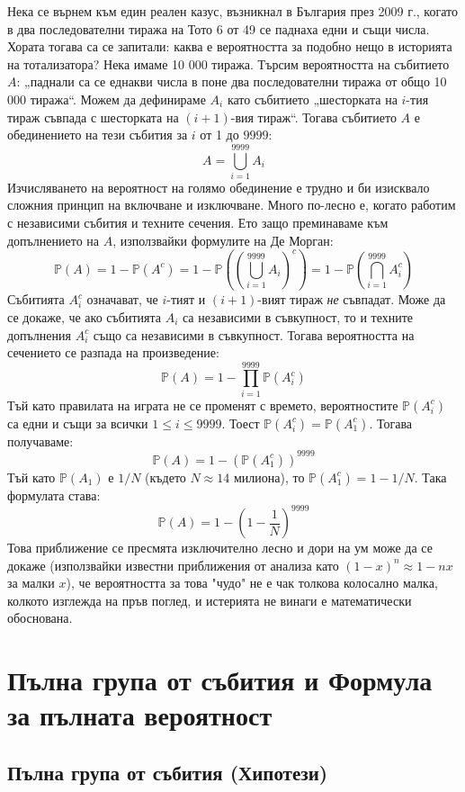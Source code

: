 \documentclass{article}
\begin{document}
Нека се върнем към един реален казус, възникнал в България през 2009 г., когато в два последователни тиража на Тото 6 от 49 се паднаха едни и същи числа. Хората тогава са се запитали: каква е вероятността за подобно нещо в историята на тотализатора?
Нека имаме 10 000 тиража. Търсим вероятността на събитието $A$: „паднали са се еднакви числа в поне два последователни тиража от общо 10 000 тиража“.
Можем да дефинираме $A_i$ като събитието „шесторката на $i$-тия тираж съвпада с шесторката на $(i+1)$-вия тираж“.
Тогава събитието $A$ е обединението на тези събития за $i$ от 1 до $9999$:
\[
A = \bigcup_{i=1}^{9999} A_i
\]
Изчисляването на вероятност на голямо обединение е трудно и би изисквало сложния принцип на включване и изключване. Много по-лесно е, когато работим с независими събития и техните сечения. Ето защо преминаваме към допълнението на $A$, използвайки формулите на Де Морган:
\[
\mathbb{P}(A) = 1 - \mathbb{P}(A^c) = 1 - \mathbb{P}\left(\left(\bigcup_{i=1}^{9999} A_i\right)^c\right) = 1 - \mathbb{P}\left(\bigcap_{i=1}^{9999} A_i^c\right)
\]
Събитията $A_i^c$ означават, че $i$-тият и $(i+1)$-вият тираж \emph{не} съвпадат. Може да се докаже, че ако събитията $A_i$ са независими в съвкупност, то и техните допълнения $A_i^c$ също са независими в съвкупност. Тогава вероятността на сечението се разпада на произведение:
\[
\mathbb{P}(A) = 1 - \prod_{i=1}^{9999} \mathbb{P}(A_i^c)
\]
Тъй като правилата на играта не се променят с времето, вероятностите $\mathbb{P}(A_i^c)$ са едни и същи за всички $1 \le i \le 9999$. Тоест $\mathbb{P}(A_i^c) = \mathbb{P}(A_1^c)$. Тогава получаваме:
\[
\mathbb{P}(A) = 1 - (\mathbb{P}(A_1^c))^{9999}
\]
Тъй като $\mathbb{P}(A_1)$ е $1 / N$ (където $N \approx 14$ милиона), то $\mathbb{P}(A_1^c) = 1 - 1/N$. Така формулата става:
\[
\mathbb{P}(A) = 1 - \left(1 - \frac{1}{N}\right)^{9999}
\]
Това приближение се пресмята изключително лесно и дори на ум може да се докаже (използвайки известни приближения от анализа като $(1-x)^n \approx 1-nx$ за малки $x$), че вероятността за това "чудо" не е чак толкова колосално малка, колкото изглежда на пръв поглед, и истерията не винаги е математически обоснована.

\section{Пълна група от събития и Формула за пълната вероятност}

\subsection{Пълна група от събития (Хипотези)}
\end{document}
